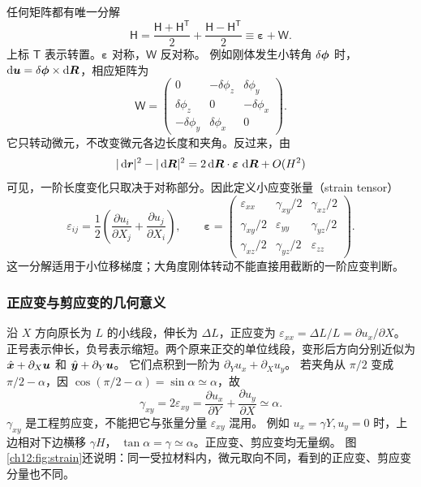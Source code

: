 任何矩阵都有唯一分解
\[
 \mathsf H=\frac{\mathsf H+\mathsf H^{\mathsf T}}2+
            \frac{\mathsf H-\mathsf H^{\mathsf T}}2
          \equiv\boldsymbol\varepsilon+\mathsf W.
\]
上标 $\mathsf T$ 表示转置。$\boldsymbol\varepsilon$ 对称，$\mathsf W$ 反对称。
例如刚体发生小转角 $\delta\bm{\phi}$ 时，
$\mathop{}\!\mathrm d\bm{u}=\delta\bm{\phi}\times\mathop{}\!\mathrm d\bm{R}$，相应矩阵为
\[
 \mathsf W=
 \begin{pmatrix}
 0&-\delta\phi_z&\delta\phi_y\\
 \delta\phi_z&0&-\delta\phi_x\\
 -\delta\phi_y&\delta\phi_x&0
 \end{pmatrix}.
\]
它只转动微元，不改变微元各边长度和夹角。反过来，由
\[
 |\mathop{}\!\mathrm d\bm{r}|^2-|\mathop{}\!\mathrm d\bm{R}|^2
 =2\mathop{}\!\mathrm d\bm{R}\cdot\boldsymbol\varepsilon\,\mathop{}\!\mathrm d\bm{R}+O(H^2)
\]
可见，一阶长度变化只取决于对称部分。因此定义小应变张量（strain tensor）
\begin{equation}
 \varepsilon_{ij}=\frac12\left(\frac{\partial u_i}{\partial X_j}
                           +\frac{\partial u_j}{\partial X_i}\right),\qquad
 \boldsymbol\varepsilon=
 \begin{pmatrix}
 \varepsilon_{xx}&\gamma_{xy}/2&\gamma_{xz}/2\\
 \gamma_{xy}/2&\varepsilon_{yy}&\gamma_{yz}/2\\
 \gamma_{xz}/2&\gamma_{yz}/2&\varepsilon_{zz}
 \end{pmatrix}.
 \label{ch12:eq:strain}
\end{equation}
这一分解适用于小位移梯度；大角度刚体转动不能直接用截断的一阶应变判断。

\subsubsection{正应变与剪应变的几何意义}

沿 $X$ 方向原长为 $L$ 的小线段，伸长为 $\Delta L$，正应变为
$\varepsilon_{xx}=\Delta L/L=\partial u_x/\partial X$。
正号表示伸长，负号表示缩短。两个原来正交的单位线段，变形后方向分别近似为
$\hat{\bm{x}}+\partial_X\bm{u}$ 和 $\hat{\bm{y}}+\partial_Y\bm{u}$。
它们点积到一阶为 $\partial_Yu_x+\partial_Xu_y$。
若夹角从 $\pi/2$ 变成 $\pi/2-\alpha$，因
$\cos(\pi/2-\alpha)=\sin\alpha\simeq\alpha$，故
\begin{equation}
 \gamma_{xy}=2\varepsilon_{xy}
 =\frac{\partial u_x}{\partial Y}+\frac{\partial u_y}{\partial X}
 \simeq\alpha.
 \label{ch12:eq:shear-angle}
\end{equation}
$\gamma_{xy}$ 是工程剪应变，不能把它与张量分量 $\varepsilon_{xy}$ 混用。
例如 $u_x=\gamma Y,u_y=0$ 时，上边相对下边横移 $\gamma H$，
$\tan\alpha=\gamma\simeq\alpha$。正应变、剪应变均无量纲。
图\ref{ch12:fig:strain}还说明：同一受拉材料内，微元取向不同，看到的正应变、剪应变分量也不同。

